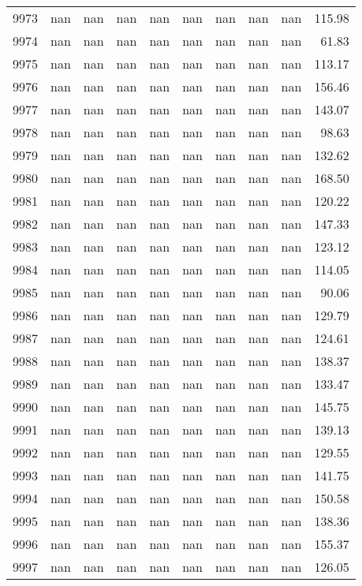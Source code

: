 \begin{tabular}{lrrrrrrrrr}
9973 & nan & nan & nan & nan & nan & nan & nan & nan & 115.98 \\
9974 & nan & nan & nan & nan & nan & nan & nan & nan & 61.83 \\
9975 & nan & nan & nan & nan & nan & nan & nan & nan & 113.17 \\
9976 & nan & nan & nan & nan & nan & nan & nan & nan & 156.46 \\
9977 & nan & nan & nan & nan & nan & nan & nan & nan & 143.07 \\
9978 & nan & nan & nan & nan & nan & nan & nan & nan & 98.63 \\
9979 & nan & nan & nan & nan & nan & nan & nan & nan & 132.62 \\
9980 & nan & nan & nan & nan & nan & nan & nan & nan & 168.50 \\
9981 & nan & nan & nan & nan & nan & nan & nan & nan & 120.22 \\
9982 & nan & nan & nan & nan & nan & nan & nan & nan & 147.33 \\
9983 & nan & nan & nan & nan & nan & nan & nan & nan & 123.12 \\
9984 & nan & nan & nan & nan & nan & nan & nan & nan & 114.05 \\
9985 & nan & nan & nan & nan & nan & nan & nan & nan & 90.06 \\
9986 & nan & nan & nan & nan & nan & nan & nan & nan & 129.79 \\
9987 & nan & nan & nan & nan & nan & nan & nan & nan & 124.61 \\
9988 & nan & nan & nan & nan & nan & nan & nan & nan & 138.37 \\
9989 & nan & nan & nan & nan & nan & nan & nan & nan & 133.47 \\
9990 & nan & nan & nan & nan & nan & nan & nan & nan & 145.75 \\
9991 & nan & nan & nan & nan & nan & nan & nan & nan & 139.13 \\
9992 & nan & nan & nan & nan & nan & nan & nan & nan & 129.55 \\
9993 & nan & nan & nan & nan & nan & nan & nan & nan & 141.75 \\
9994 & nan & nan & nan & nan & nan & nan & nan & nan & 150.58 \\
9995 & nan & nan & nan & nan & nan & nan & nan & nan & 138.36 \\
9996 & nan & nan & nan & nan & nan & nan & nan & nan & 155.37 \\
9997 & nan & nan & nan & nan & nan & nan & nan & nan & 126.05 \\

\end{tabular}
